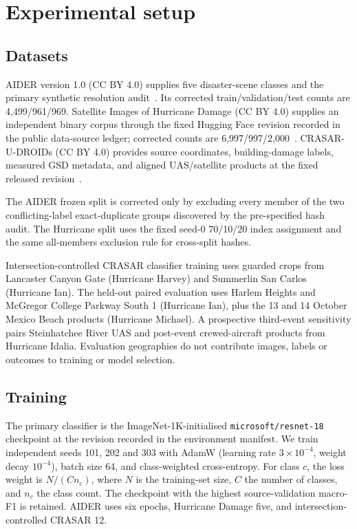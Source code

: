\section{Experimental setup}

\subsection{Datasets}

AIDER version 1.0 (CC BY 4.0) supplies five disaster-scene classes and the
primary synthetic resolution audit~\citep{aiderdata}. Its corrected
train/validation/test counts are 4,499/961/969. Satellite Images of Hurricane
Damage (CC BY 4.0) supplies an independent binary corpus through the
fixed Hugging Face revision recorded in the public data-source ledger; corrected counts are
6,997/997/2,000~\citep{hurricanedata}. CRASAR-U-DROIDs (CC BY 4.0) provides
source coordinates, building-damage labels, measured GSD metadata, and aligned
UAS/satellite products at the fixed released revision~\citep{crasar2024data}.

The AIDER frozen split is corrected only by excluding every member of the two
conflicting-label exact-duplicate groups discovered by the pre-specified hash
audit. The Hurricane split uses the fixed seed-0 70/10/20 index assignment and
the same all-members exclusion rule for cross-split hashes.

Intersection-controlled CRASAR classifier training uses guarded crops from Lancaster Canyon
Gate (Hurricane Harvey) and Summerlin San Carlos (Hurricane Ian). The held-out
paired evaluation uses Harlem Heights and McGregor College Parkway South 1
(Hurricane Ian), plus the 13 and 14 October Mexico Beach products (Hurricane
Michael). A prospective third-event sensitivity pairs Steinhatchee River UAS
and post-event crewed-aircraft products from Hurricane Idalia. Evaluation
geographies do not contribute images, labels or outcomes to training or model
selection.

\subsection{Training}

The primary classifier is the ImageNet-1K-initialised
\texttt{microsoft/resnet-18} checkpoint at the revision recorded in the
environment manifest. We train independent seeds
101, 202 and 303 with AdamW (learning rate \(3\times10^{-4}\), weight decay
\(10^{-4}\)), batch size 64, and class-weighted cross-entropy. For class \(c\),
the loss weight is \(N/(C n_c)\), where \(N\) is the training-set size, \(C\)
the number of classes, and \(n_c\) the class count. The checkpoint with the
highest source-validation macro-F1 is retained. AIDER uses six epochs,
Hurricane Damage five, and intersection-controlled CRASAR 12.

